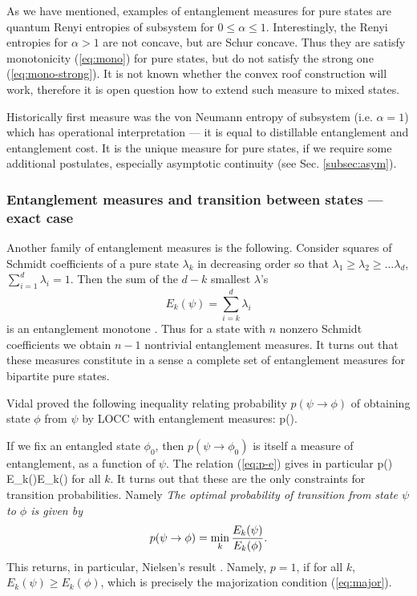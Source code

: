 \documentclass[twocolumn,aps,rmp]{revtex4}
\begin{document}
As we have mentioned, examples of entanglement measures for pure
states are quantum Renyi entropies of subsystem for
$0\leq\alpha\leq1$. Interestingly, the Renyi entropies for
$\alpha>1$ are not concave, but are Schur concave. Thus they are
satisfy monotonicity (\ref{eq:mono}) for pure states, but do not
satisfy the strong one (\ref{eq:mono-strong}). It is not  known
whether the convex roof construction will work, therefore it is open question
 how to extend such measure to mixed states.



Historically first measure was the von Neumann entropy of subsystem
(i.e. $\alpha=1$) which has operational interpretation --- it is equal
to distillable entanglement and entanglement cost. It is the unique
measure for pure states, if we require some additional postulates,
especially asymptotic continuity (see Sec. \ref{subsec:asym}).



\subsubsection{Entanglement measures and transition between states --- exact case}
\label{subsubsec:em-tr-exact}
Another family of entanglement measures is the following. Consider
squares of Schmidt coefficients of a pure state $\lambda_k$ in
decreasing order so that $\lambda_1 \geq \lambda_2 \geq \ldots
\lambda_d$, $\sum_{i=1}^d\lambda_i=1$. Then the sum of the $d-k$
smallest $\lambda$'s \begin{equation} E_k(\psi)=\sum_{i=k}^d \lambda_i \end{equation} is an
entanglement monotone \cite{Vidal1999-ent-pure}. Thus for a state
with $n$ nonzero Schmidt coefficients we obtain $n-1$ nontrivial
entanglement measures. It turns out that these measures constitute
in a sense a complete set of entanglement measures for bipartite
pure states.

Vidal proved the following inequality relating probability $p(\psi\to \phi)$
of obtaining state $\phi$ from $\psi$ by LOCC with entanglement measures:
\be
p(\psi\to \phi).
\label{eq:p-e}
\ee

If we fix an entangled state $\phi_0$, then $p(\psi\to \phi_0)$ is
itself a measure of entanglement, as a function of $\psi$. The
relation (\ref{eq:p-e}) gives in particular \be p(\psi\to \phi) \leq
{E_k(\psi)\over E_k(\phi)} \ee for all $k$. It turns out that these
are the only constraints for transition probabilities. Namely
\cite{Vidal1999-ent-pure} {\it
The optimal probability of transition from state $\psi$ to $\phi$ is
given by \begin{equation} p(\psi\to \phi)=\min_k {E_k(\psi)\over E_k(\phi)}. \end{equation}
} This returns, in particular, Nielsen's result
\cite{Nielsen-pure-entanglement}. Namely, $p=1$, if for all $k$,
$E_k(\psi)\geq E_k(\phi)$, which is precisely the majorization
condition (\ref{eq:major}).
\end{document}
